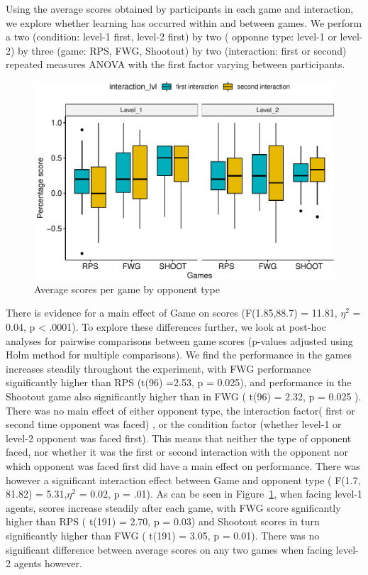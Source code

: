 \documentclass[man,floatsintext]{apa6}
\begin{document}
Using the average scores obtained by participants in each game and interaction, we explore whether learning has occurred within and between games. We perform a two (condition: level-1 first, level-2 first) by two ( opponne type: level-1 or level-2) by three (game: RPS, FWG, Shootout) by two (interaction: first or second) repeated measures ANOVA with the first factor varying between participants.

\begin{figure}

{\centering \includegraphics{draft_report_v1_files/figure-latex/exp2-score-by-opp-1} 

}

\caption{Average scores per game by opponent type}\label{fig:exp2-score-by-opp}
\end{figure}

There is evidence for a main effect of Game on scores (F(1.85,88.7) = 11.81, \(\eta^{2}\) = 0.04, p \textless{} .0001). To explore these differences further, we look at post-hoc analyses for pairwise comparisons between game scores (p-values adjusted using Holm method for multiple comparisons). We find the performance in the games increases steadily throughout the experiment, with FWG performance significantly higher than RPS (t(96) =2.53, p = 0.025), and performance in the Shootout game also significantly higher than in FWG ( t(96) = 2.32, p = 0.025 ). There was no main effect of either opponent type, the interaction factor( first or second time opponent was faced) , or the condition factor (whether level-1 or level-2 opponent was faced first). This means that neither the type of opponent faced, nor whether it was the first or second interaction with the opponent nor which opponent was faced first did have a main effect on performance. There was however a significant interaction effect between Game and opponent type ( F(1.7, 81.82) = 5.31,\(\eta^{2}\) = 0.02, p = .01). As can be seen in Figure~\ref{fig:exp2-score-by-opp}, when facing level-1 agents, scores increase steadily after each game, with FWG score sgnificantly higher than RPS ( t(191) = 2.70, p = 0.03) and Shootout scores in turn significantly higher than FWG ( t(191) = 3.05, p = 0.01). There was no significant difference between average scores on any two games when facing level-2 agents however.
\end{document}
